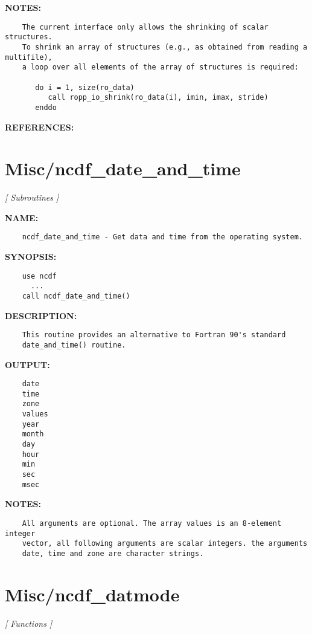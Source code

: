 \textbf{NOTES:}\hspace{0.08in}\begin{Verbatim}
    The current interface only allows the shrinking of scalar structures.
    To shrink an array of structures (e.g., as obtained from reading a multifile),
    a loop over all elements of the array of structures is required:

       do i = 1, size(ro_data)
          call ropp_io_shrink(ro_data(i), imin, imax, stride)
       enddo
\end{Verbatim}
\textbf{REFERENCES:}\hspace{0.08in}\section{Misc/ncdf\_date\_and\_time}
\textsl{[ Subroutines ]}

\label{ch:robo73}
\label{ch:Misc_ncdf_date_and_time}
\textbf{NAME:}\hspace{0.08in}\begin{Verbatim}
    ncdf_date_and_time - Get data and time from the operating system.
\end{Verbatim}
\textbf{SYNOPSIS:}\hspace{0.08in}\begin{Verbatim}
    use ncdf
      ...
    call ncdf_date_and_time()
\end{Verbatim}
\textbf{DESCRIPTION:}\hspace{0.08in}\begin{Verbatim}
    This routine provides an alternative to Fortran 90's standard 
    date_and_time() routine.
\end{Verbatim}
\textbf{OUTPUT:}\hspace{0.08in}\begin{Verbatim}
    date
    time
    zone
    values
    year
    month
    day
    hour
    min
    sec
    msec
\end{Verbatim}
\textbf{NOTES:}\hspace{0.08in}\begin{Verbatim}
    All arguments are optional. The array values is an 8-element integer
    vector, all following arguments are scalar integers. the arguments
    date, time and zone are character strings.
\end{Verbatim}
\section{Misc/ncdf\_datmode}
\textsl{[ Functions ]}

